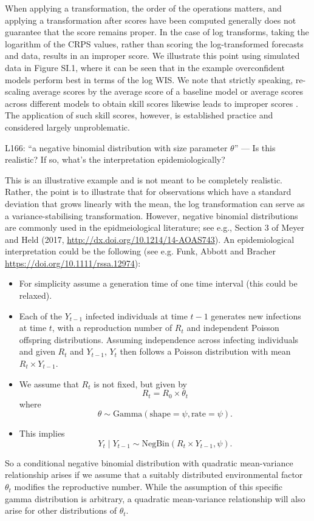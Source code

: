 \documentclass{article}
\newcommand{\black}{\color{black}}
\newcommand{\blue}{\color{blue}}
\newcommand{\notindented}{\setlength{\leftskip}{0cm}}
\begin{document}
When applying a transformation, the order of the operations matters, and applying a transformation after scores have been computed generally does not guarantee that the score remains proper. In the case of log transforms, taking the logarithm of the CRPS values, rather than scoring the log-transformed forecasts and data, results in an improper score. We illustrate this point using simulated data in Figure SI.1, where it can be seen that in the example overconfident models perform best in terms of the log WIS. We note that strictly speaking, re-scaling average scores by the average score of a baseline model or average scores across different models  to obtain skill scores likewise leads to improper scores \citep{gneitingStrictlyProperScoring2007}. The application of such skill scores, however, is established practice and considered largely unproblematic.

\notindented



\blue
L166: “a negative binomial distribution with size parameter $\theta$” — Is this realistic? If so, what’s the interpretation epidemiologically?

\black
This is an illustrative example and is not meant to be completely realistic. Rather, the point is to illustrate that for observations which have a standard deviation that grows linearly with the mean, the log transformation can serve as a variance-stabilising transformation. However, negative binomial distributions are commonly used in the epidmeiological literature; see e.g., Section 3 of Meyer and Held (2017, \url{http://dx.doi.org/10.1214/14-AOAS743}). An epidemiological interpretation could be the following (see e.g. Funk, Abbott and Bracher \url{https://doi.org/10.1111/rssa.12974}):
\begin{itemize}
    \item For simplicity assume a generation time of one time interval (this could be relaxed).
    \item Each of the $Y_{t - 1}$ infected individuals at time $t - 1$  generates new infections at time $t$, with a reproduction number of $R_t$ and independent Poisson offspring distributions. Assuming independence across infecting individuals and given $R_t$ and $Y_{t - 1}$, $Y_t$ then follows a Poisson distribution with mean $R_t \times Y_{t - 1}$.
    \item We assume that $R_t$ is not fixed, but given by
    $$
    R_t = R_0 \times \theta_t
    $$
    where
    $$
    \theta \sim \text{Gamma}(\text{shape} = \psi, \text{rate} = \psi).
    $$
    \item This implies
    $$
    Y_t \mid Y_{t - 1} \sim \text{NegBin}(R_t \times Y_{t - 1}, \psi).
    $$
\end{itemize}
So a conditional negative binomial distribution with quadratic mean-variance relationship arises if we assume that a suitably distributed environmental factor $\theta_t$ modifies the reproductive number. While the assumption of this specific gamma distribution is arbitrary, a quadratic mean-variance relationship will also arise for other distributions of $\theta_t$.
\end{document}
